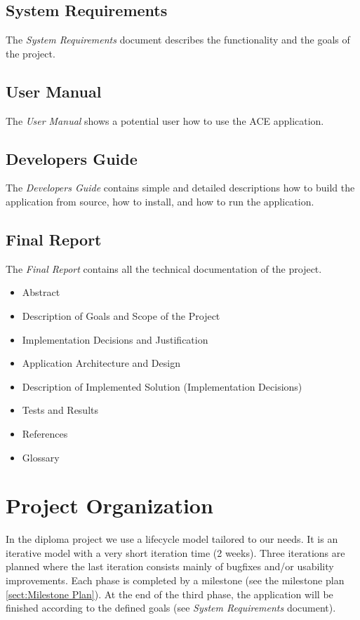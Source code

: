 \documentclass[11pt,a4paper]{article}
\begin{document}
\subsection{System Requirements}
The \emph{System Requirements} document describes the functionality and
the goals of the project.

\subsection{User Manual}
The \emph{User Manual} shows a potential user how to use the ACE application.

\subsection{Developers Guide}
The \emph{Developers Guide} contains simple and detailed descriptions how
to build the application from source, how to install, and how to run
the application. 

\subsection{Final Report}
The \emph{Final Report} contains all the technical documentation of the project.
\begin{itemize}
 \item Abstract
 \item Description of Goals and Scope of the Project
 \item Implementation Decisions and Justification
 \item Application Architecture and Design
 \item Description of Implemented Solution (Implementation Decisions)
 \item Tests and Results
 \item References
 \item Glossary
\end{itemize}


\section{Project Organization}

In the diploma project we use a lifecycle model tailored to our needs. It is an
iterative model with a very short iteration time (2 weeks). Three iterations 
are planned where the last iteration consists mainly of bugfixes and/or
usability improvements. Each phase is completed by a milestone (see the 
milestone plan \ref{sect:Milestone Plan}). At the end of the third phase, the 
application will be finished according to the defined goals (see
\emph{System Requirements} document).
\end{document}
